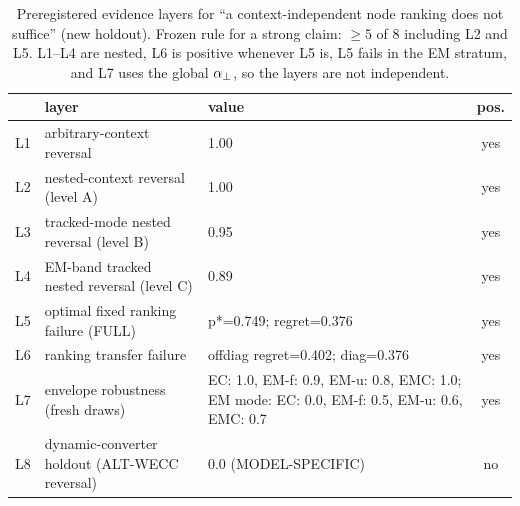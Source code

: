 \begin{table}[!t]
\centering
\caption{Preregistered evidence layers for ``a context-independent node ranking does not suffice'' (new holdout). Frozen rule for a strong claim: $\ge5$ of 8 including L2 and L5. L1--L4 are nested, L6 is positive whenever L5 is, L5 fails in the EM stratum, and L7 uses the global $\aperp$, so the layers are not independent.}\label{tab:layers}
\scriptsize
\setlength{\tabcolsep}{2pt}
\begin{tabular}{@{}cL{0.44\columnwidth}L{0.36\columnwidth}c@{}}
\toprule
& layer & value & pos. \\
\midrule
L1 & arbitrary-context reversal & 1.00 & yes \\
L2 & nested-context reversal (level A) & 1.00 & yes \\
L3 & tracked-mode nested reversal (level B) & 0.95 & yes \\
L4 & EM-band tracked nested reversal (level C) & 0.89 & yes \\
L5 & optimal fixed ranking failure (FULL) & p*=0.749; regret=0.376 & yes \\
L6 & ranking transfer failure & offdiag regret=0.402; diag=0.376 & yes \\
L7 & envelope robustness (fresh draws) & EC: 1.0, EM-f: 0.9, EM-u: 0.8, EMC: 1.0; EM mode: EC: 0.0, EM-f: 0.5, EM-u: 0.6, EMC: 0.7 & yes \\
L8 & dynamic-converter holdout (ALT-WECC reversal) & 0.0 (MODEL-SPECIFIC) & no \\
\bottomrule
\end{tabular}
\end{table}
